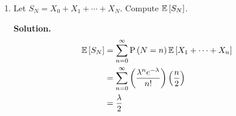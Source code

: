 \documentclass[titlepage]{article}
\begin{document}
\begin{enumerate}
\begin{enumerate}
  \item Let $S_N = X_0 + X_1 + \cdots + X_N$. Compute $\mathbb{E}\left[ S_N \right]$.

  \textbf{Solution.}
  \[\begin{aligned}
  \mathbb{E}\left[ S_N \right] &= \sum_{n = 0}^{\infty} \text{P}\left( N = n \right) \mathbb{E}\left[ X_1 + \cdots + X_n \right] \\
  &= \sum_{n=0}^\infty \left(\frac{\lambda^n e^{-
  \lambda}}{n!} \right) \left(\frac{n}{2}\right)\\
  &= \frac{\lambda}{2}
  \end{aligned}\]
  \end{enumerate}

\end{enumerate}
\end{document}

